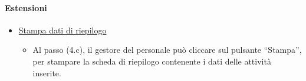 \paragraph{Estensioni}
\begin{itemize}
	\item \underline{Stampa dati di riepilogo}
		\begin{itemize}
			\item Al passo (4.c), il gestore del personale può cliccare sul pulsante “Stampa”, per stampare la scheda di riepilogo contenente i dati delle attività inserite.  
		\end{itemize}
\end{itemize}
